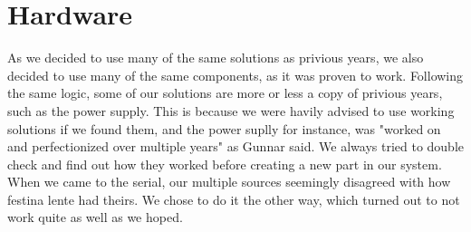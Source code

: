 \section {Hardware}

As we decided to use many of the same solutions as privious years, we also decided to use many of the same components, as it was proven to work. Following the same logic, some of our solutions are more or less a copy of privious years, such as the power supply. This is because we were havily advised to use working solutions if we found them, and the power suplly for instance, was "worked on and perfectionized over multiple years" as Gunnar said. We always tried to double check and find out how they worked before creating a new part in our system. When we came to the serial, our multiple sources seemingly disagreed with how festina lente had theirs. We chose to do it the other way, which turned out to not work quite as well as we hoped.
